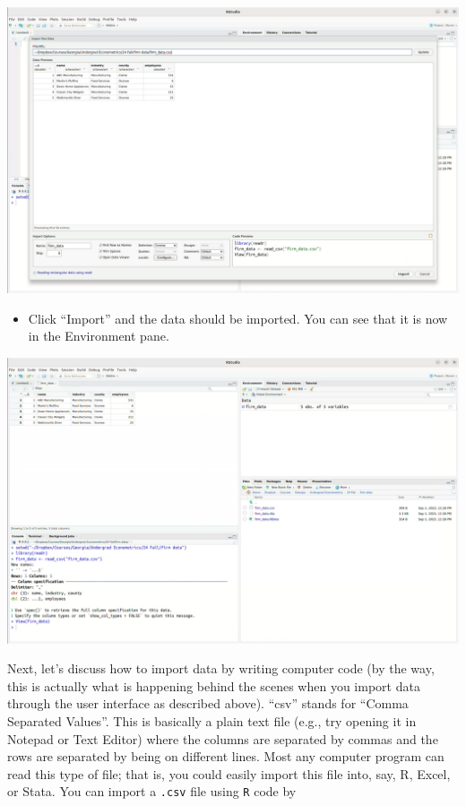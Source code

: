 \documentclass[
  letterpaper,
  DIV=11,
  numbers=noendperiod]{scrreprt}
\providecommand{\tightlist}{%
  \setlength{\itemsep}{0pt}\setlength{\parskip}{0pt}}\usepackage{longtable,booktabs,array}
\begin{document}
\includegraphics{import_data.png}

\begin{itemize}
\tightlist
\item
  Click ``Import'' and the data should be imported. You can see that it
  is now in the Environment pane.
\end{itemize}

\includegraphics{import_data2.png}

Next, let's discuss how to import data by writing computer code (by the
way, this is actually what is happening behind the scenes when you
import data through the user interface as described above). ``csv''
stands for ``Comma Separated Values''. This is basically a plain text
file (e.g., try opening it in Notepad or Text Editor) where the columns
are separated by commas and the rows are separated by being on different
lines. Most any computer program can read this type of file; that is,
you could easily import this file into, say, R, Excel, or Stata. You can
import a \texttt{.csv} file using \texttt{R} code by
\end{document}
